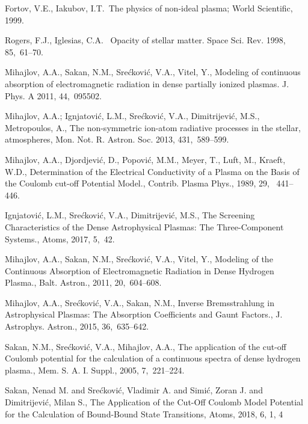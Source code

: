 \documentclass[a1]{sciposter}
\begin{document}
\begin{multicols}{3}
\begin{thebibliography}{99}

 Fortov, V.E., Iakubov, I.T.~The physics of non-ideal plasma; World Scientific,  1999.

 Rogers, F.J., Iglesias, C.A.~ Opacity of stellar matter. Space Sci. Rev. 1998, 85,~61--70.
 
 Mihajlov, A.A., Sakan, N.M., Sre{\'c}kovi{\'c}, V.A., {Vitel}, Y., Modeling of continuous 
  absorption of electromagnetic radiation in dense partially ionized plasmas. J. Phys. A 2011, 44,~095502.
  
 {Mihajlov}, A.A.; {Ignjatovi{\'c}}, L.M., {Sre{\'c}kovi{\'c}}, V.A.,
  {Dimitrijevi{\'c}}, M.S., {Metropoulos}, A., The non-symmetric ion-atom radiative processes in the stellar, atmospheres, Mon. Not. R. Astron. Soc. 2013, 431,~589--599.
 
 Mihajlov, A.A., Djordjević, D., Popović, M.M., Meyer, T., Luft, M., Kraeft, W.D., Determination of the Electrical Conductivity of a Plasma on the Basis
  of the Coulomb cut-off Potential Model., Contrib. Plasma Phys., 1989, 29, ~441--446.
  
 {Ignjatovi{\'c}}, L.M., {Sre{\'c}kovi{\'c}}, V.A., {Dimitrijevi{\'c}}, M.S., The Screening Characteristics of the Dense Astrophysical Plasmas: The
  Three-Component Systems., Atoms, 2017, 5,~42.

 Mihajlov, A.A., {Sakan}, N.M., {Sre{\'c}kovi{\'c}}, V.A., {Vitel}, Y., Modeling of the Continuous Absorption of Electromagnetic Radiation in Dense Hydrogen Plasma., 
  Balt. Astron., 2011, 20,~604--608.
  
 {Mihajlov}, A.A., {Sre{\'c}kovi{\'c}}, V.A., {Sakan}, N.M., Inverse Bremsstrahlung in Astrophysical Plasmas: The Absorption
  Coefficients and Gaunt Factors., J. Astrophys. Astron., 2015, 36,~635--642. 

 {Sakan}, N.M., {Sre{\'c}kovi{\'c}}, V.A., {Mihajlov}, A.A., The application of the cut-off Coulomb potential for the calculation
  of a continuous spectra of dense hydrogen plasma., Mem. S. A. I. Suppl., 2005, 7,~221--224.

 Sakan, Nenad M. and Srećković, Vladimir A. and Simić, Zoran J. and Dimitrijević, Milan S., 
The Application of the Cut-Off Coulomb Model Potential for the Calculation of Bound-Bound State Transitions, Atoms, 2018, 6, 1, 4


\end{thebibliography}
\end{multicols}
\end{document}
